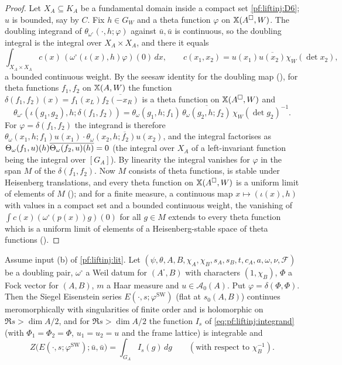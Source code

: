 \begin{proof}
Let $X_A\subseteq K_A$ be a fundamental domain inside a compact set \ref{pf:liftinj:D6}; $u$ is bounded, say by $C$. Fix $h\in G_W$ and a theta
function $\varphi$ on $\mathbb{X}(A^\square,W)$. The doubling integrand of $\theta_{\omega^\square}(\cdot,h;\varphi)$ against $\bar u,\bar u$ is
continuous, so the doubling integral is the integral over $X_A\times X_A$, and there it equals
\[
\int_{X_A\times X_A}c(x)\,(\omega^\square(\iota(x),h)\varphi)(0)\,dx,\qquad c(x_1,x_2)=u(x_1)\overline{u(x_2)}\chi_W(\det x_2),
\]
a bounded continuous weight. By the seesaw identity for the doubling map
(), for theta functions $f_1,f_2$ on $\mathbb{X}(A,W)$ the function
$\delta(f_1,f_2)(x)=f_1(x_L)\overline{f_2(-x_R)}$ is a theta function on $\mathbb{X}(A^\square,W)$ and
\[
\theta_{\omega^\square}(\iota(g_1,g_2),h;\delta(f_1,f_2))=\theta_\omega(g_1,h;f_1)\,\overline{\theta_\omega(g_2,h;f_2)}\,\chi_W(\det g_2)^{-1}.
\]
For $\varphi=\delta(f_1,f_2)$ the integrand is therefore $\theta_\omega(x_1,h;f_1)u(x_1)\cdot\overline{\theta_\omega(x_2,h;f_2)u(x_2)}$, and the
integral factorises as $\Theta_\omega(f_1,u)(h)\overline{\Theta_\omega(f_2,u)(h)}=0$ (the integral over $X_A$ of a left-invariant
function being the integral over $[G_A]$). By linearity the integral vanishes for $\varphi$ in the span $M$ of the $\delta(f_1,f_2)$. Now $M$
consists of theta functions, is stable under Heisenberg translations, and every theta function on $\mathbb{X}(A^\square,W)$ is a uniform limit of
elements of $M$ (); and for a finite measure, a continuous map $x\mapsto(\iota(x),h)$
with values in a compact set and a bounded continuous weight, the vanishing of $\int c(x)(\omega^\square(p(x))g)(0)$ for all $g\in M$ extends to every
theta function which is a uniform limit of elements of a Heisenberg-stable space of theta functions
().
\end{proof}

\begin{lemma}\label{pf:liftinj:zetaint}
Assume input (b) of \cref{pf:liftinj:lit}. Let $(\psi,\theta,A,B,\chi_A,\chi_B,s_A,s_B,t,c_A,a,\omega,\nu,\mathcal F)$ be a doubling pair,
$\omega^\square$ a Weil datum for $(A^\square,B)$ with characters $(1,\chi_B)$, $\Phi$ a Fock vector for $(A,B)$, $m$ a Haar measure and
$u\in\mathcal A_0(A)$. Put $\varphi=\delta(\Phi,\Phi)$. Then the Siegel Eisenstein series $E(\cdot,s;\varphi^{\mathrm{SW}})$ (flat at
$s_0(A,B)$) continues meromorphically with singularities of finite order and is holomorphic on $\Re s>\dim A/2$, and for $\Re s>\dim A/2$
the function $I_s$ of \eqref{eq:pf:liftinj:integrand} (with $\Phi_1=\Phi_2=\Phi$, $u_1=u_2=u$ and the frame lattice) is integrable and
\[
Z\bigl(E(\cdot,s;\varphi^{\mathrm{SW}});\bar u,\bar u\bigr)=\int_{G_A}I_s(g)\,dg\qquad(\text{with respect to }\chi_B^{-1}).
\]
\end{lemma}

